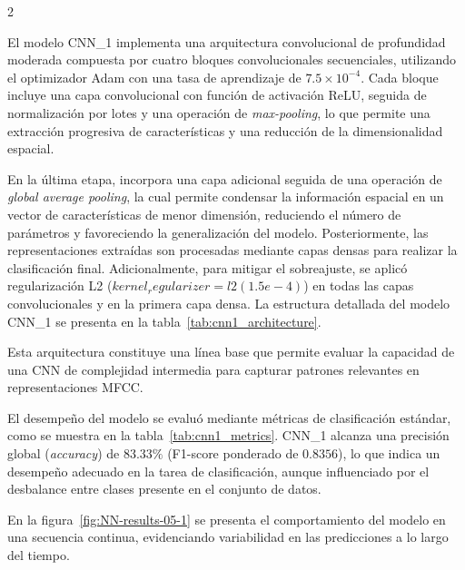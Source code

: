 \documentclass[12pt]{report}
\newenvironment{tightmulticols}{%
  \begin{multicols}{2}
  \setlength{\parskip}{1.2pt}
  \linespread{1}\selectfont
}{%
  \end{multicols}
}
\begin{document}
\begin{tightmulticols}
\noindent El modelo CNN\_1 implementa una arquitectura convolucional de profundidad moderada compuesta por cuatro bloques convolucionales secuenciales, utilizando el optimizador Adam con una tasa de aprendizaje de $7.5 \times 10^{-4}$. Cada bloque incluye una capa convolucional con función de activación ReLU, seguida de normalización por lotes y una operación de \textit{max-pooling}, lo que permite una extracción progresiva de características y una reducción de la dimensionalidad espacial.

\par En la última etapa, incorpora una capa adicional seguida de una operación de \textit{global average pooling}, la cual permite condensar la información espacial en un vector de características de menor dimensión, reduciendo el número de parámetros y favoreciendo la generalización del modelo. Posteriormente, las representaciones extraídas son procesadas mediante capas densas para realizar la clasificación final. Adicionalmente, para mitigar el sobreajuste, se aplicó regularización L2 ($kernel_regularizer=l2(1.5e-4)$) en todas las capas convolucionales y en la primera capa densa. La estructura detallada del modelo CNN\_1 se presenta en la tabla~\ref{tab:cnn1_architecture}.

\par Esta arquitectura constituye una línea base que permite evaluar la capacidad de una CNN de complejidad intermedia para capturar patrones relevantes en representaciones MFCC.

\par El desempeño del modelo se evaluó mediante métricas de clasificación estándar, como se muestra en la tabla~\ref{tab:cnn1_metrics}. CNN\_1 alcanza una precisión global (\textit{accuracy}) de $83.33\%$ (F1-score ponderado de $0.8356$), lo que indica un desempeño adecuado en la tarea de clasificación, aunque influenciado por el desbalance entre clases presente en el conjunto de datos.

\par En la figura~\ref{fig:NN-results-05-1} se presenta el comportamiento del modelo en una secuencia continua, evidenciando variabilidad en las predicciones a lo largo del tiempo.

\end{tightmulticols}
\end{document}

